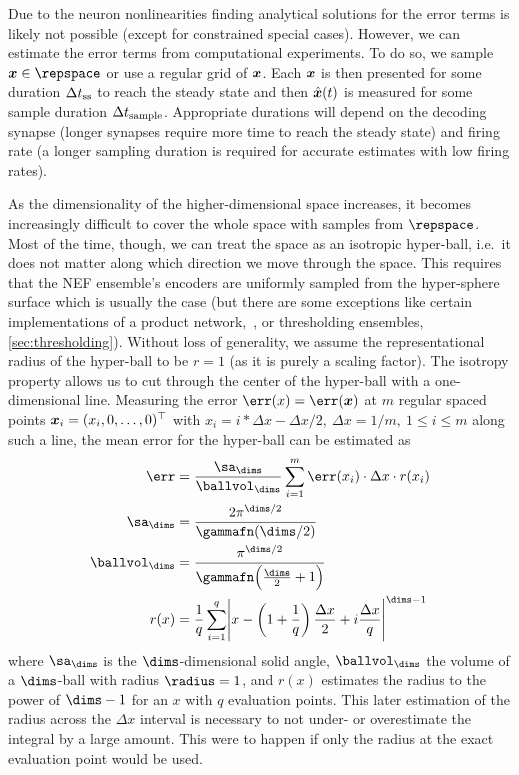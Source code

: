 Due to the neuron nonlinearities finding analytical solutions for the error terms is likely not possible (except for constrained special cases).
However, we can estimate the error terms from computational experiments.
To do so, we sample $\vc x \in \repspace$ or use a regular grid of $\bm{x}$.
Each $\bm{x}$ is then presented for some duration $\Delta t_{{\mathrm{ss}}}$ to reach the steady state and then $\hat{\bm{x}}(t)$ is measured for some sample duration $\Delta t_{{\mathrm{sample}}}$.
Appropriate durations will depend on the decoding synapse (longer synapses require more time to reach the steady state) and firing rate (a longer sampling duration is required for accurate estimates with low firing rates).

As the dimensionality of the higher-dimensional space increases, it becomes increasingly difficult to cover the whole space with samples from $\repspace$.
Most of the time, though, we can treat the space as an isotropic hyper-ball, i.e.\ it does not matter along which direction we move through the space.
This requires that the NEF ensemble's encoders are uniformly sampled from the hyper-sphere surface which is usually the case (but there are some exceptions like certain implementations of a product network,~\cite{gosmann2015-1}, or thresholding ensembles, \cref{sec:thresholding}).
Without loss of generality, we assume the representational radius of the hyper-ball to be $r = 1$ (as it is purely a scaling factor).
The isotropy property allows us to cut through the center of the hyper-ball with a one-dimensional line.
Measuring the error $\err(x) = \err(\vc x)$ at $m$ regular spaced points $\bm{x}_i = (x_i, 0, \dotsc, 0)^{\top}$ with $x_i = i * \Delta x - \Delta x/2,\ \Delta x = 1/m,\ 1 \leq i \leq m$ along such a line, the mean error for the hyper-ball can be estimated as
\begin{align}
    \err &= \frac{\sa_{\dims}}{\ballvol_{\dims}} \sum_{i=1}^{m} \err(x_i) \cdot \Delta x \cdot r(x_i) \\
    \sa_{\dims} &= \frac{2 \pi^{\dims/2}}{\gammafn(\dims/2)} \\
    \ballvol_{\dims} &= \frac{\pi^{\dims/2}}{\gammafn\!\del{\frac{\dims}{2} + 1}} \\
    r(x) &= \frac{1}{q} \sum_{i=1}^{q} \abs{x - \del{1 + \frac{1}{q}} \frac{\Delta x}{2} + i \frac{\Delta x}{q}}^{\dims - 1}
\end{align}
where $\sa_{\dims}$ is the $\dims$-dimensional solid angle, $\ballvol_{\dims}$ the volume of a $\dims$-ball with radius $\radius = 1$, and $r(x)$ estimates the radius to the power of $\dims-1$ for an $x$ with $q$ evaluation points.
This later estimation of the radius across the $\Delta x$ interval is necessary to not under- or overestimate the integral by a large amount.
This were to happen if only the radius at the exact evaluation point would be used.


